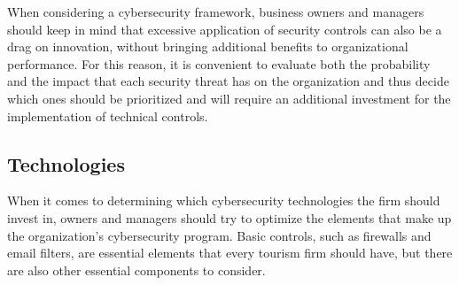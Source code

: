 \documentclass[
  letterpaper,
  DIV=11,
  numbers=noendperiod]{scrreprt}
\begin{document}
When considering a cybersecurity framework, business owners and managers
should keep in mind that excessive application of security controls can
also be a drag on innovation, without bringing additional benefits to
organizational performance. For this reason, it is convenient to
evaluate both the probability and the impact that each security threat
has on the organization and thus decide which ones should be prioritized
and will require an additional investment for the implementation of
technical controls.

\hypertarget{technologies}{%
\subsection{Technologies}\label{technologies}}

When it comes to determining which cybersecurity technologies the firm
should invest in, owners and managers should try to optimize the
elements that make up the organization's cybersecurity program. Basic
controls, such as firewalls and email filters, are essential elements
that every tourism firm should have, but there are also other essential
components to consider.
\end{document}
